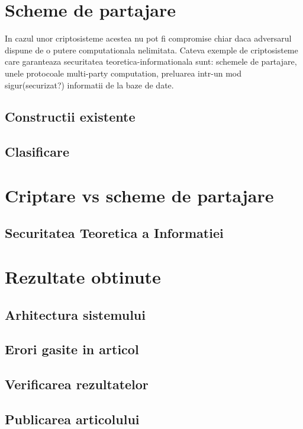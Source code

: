 \documentclass{llncs}
\begin{document}
\section{Scheme de partajare}
\label{sec:encryption}
In cazul unor criptosisteme acestea nu pot fi compromise chiar daca adversarul dispune de o putere computationala nelimitata. Cateva exemple de criptosisteme care garanteaza securitatea teoretica-informationala sunt: schemele de partajare, unele protocoale multi-party computation, preluarea intr-un mod sigur(securizat?) informatii de la baze de date.
\subsection{Constructii existente}
\subsection{Clasificare}

\section{Criptare vs scheme de partajare}

\subsection{Securitatea Teoretica a Informatiei}
\label{sec:crypt_vs_sharing}

\section{Rezultate obtinute}
\label{sec:results}
\subsection{Arhitectura sistemului}
\subsection{Erori gasite in articol}
\subsection{Verificarea rezultatelor}
\subsection{Publicarea articolului}

%
%
%



\end{document}
